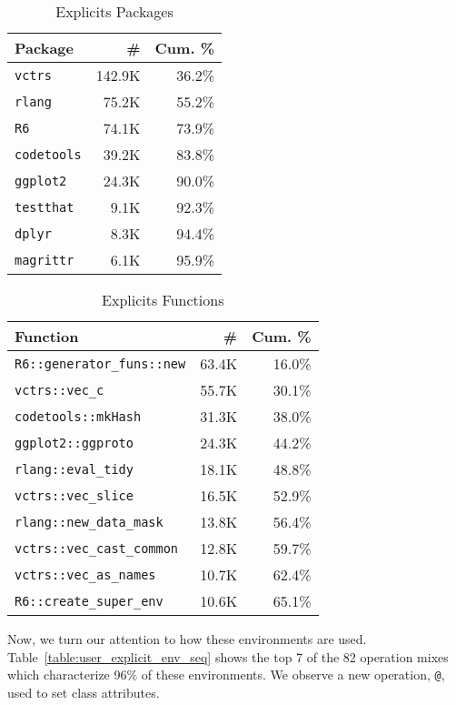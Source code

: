 \documentclass[10pt,sigplan,authorversion=true]{acmart}
\renewcommand{\c}[1]{\lstinline |#1|\xspace}
\begin{document}
\begin{table}[!h]
  \small
  \caption{Explicits Packages} \label{table:user_explicit_pack}
  \centering
  \begin{tabular}{lrr}
    \toprule
    \textbf{Package}&\textbf{\#}&\textbf{Cum. \%}\\
    \midrule
    \c{vctrs}&142.9K&36.2\%\\
    \c{rlang}&75.2K&55.2\%\\
    \c{R6}&74.1K&73.9\%\\
    \c{codetools}&39.2K&83.8\%\\
    \c{ggplot2}&24.3K&90.0\%\\
    \c{testthat}&9.1K&92.3\%\\
    \c{dplyr}&8.3K&94.4\%\\
    \c{magrittr}&6.1K&95.9\%\\
    \bottomrule
  \end{tabular}
\end{table}


\begin{table}[!h]
  \small
  \caption{Explicits Functions} \label{table:user_explicit_fun}
  \centering
  \begin{tabular}{lrr}\toprule
    \textbf{Function}&\textbf{\#}&\textbf{Cum. \%}\\
    \midrule
    \c{R6::generator_funs::new}&63.4K&16.0\%\\
    \c{vctrs::vec_c}&55.7K&30.1\%\\
    \c{codetools::mkHash}&31.3K&38.0\%\\
    \c{ggplot2::ggproto}&24.3K&44.2\%\\
    \c{rlang::eval_tidy}&18.1K&48.8\%\\
    \c{vctrs::vec_slice}&16.5K&52.9\%\\
    \c{rlang::new_data_mask}&13.8K&56.4\%\\
    \c{vctrs::vec_cast_common}&12.8K&59.7\%\\
    \c{vctrs::vec_as_names}&10.7K&62.4\%\\
    \c{R6::create_super_env}&10.6K&65.1\%\\
    \bottomrule
  \end{tabular}
\end{table}


Now, we turn our attention to how these environments are used.
Table~\ref{table:user_explicit_env_seq} shows the top 7 of the 82 operation
mixes which characterize 96\% of these environments. We observe a new operation,
\texttt{@}, used to set class attributes.
\end{document}
